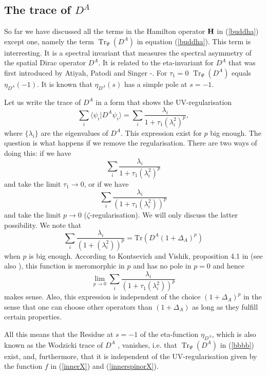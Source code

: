 \documentclass[12pt]{article}
\newcommand{\Tr}{\operatorname{Tr}}
\begin{document}
\subsection{The trace of $D^A$ }

So far we have discussed all the terms in the Hamilton operator ${\bf H}$ in (\ref{buddha}) except one, namely the term $\Tr_\Psi (D^A)$ in equation (\ref{buddha}).
This term  is interresting. It is a spectral invariant that measures the spectral asymmetry of the spatial Dirac operator $D^A$. It is related to the eta-invariant for $D^A$ that was first introduced by Atiyah, Patodi and Singer \cite{Atiyah}-\cite{AtiyahIII}. For $\tau_1=0$ $\Tr_\Psi (D^A)$ equals $\eta_{D^A}(-1)$. It is known \cite{AtiyahIII} that $\eta_{D^A}(s)$ has a simple pole at $s=-1$. 

Let us write the trace of $D^A$ in a form that shows the UV-regularisation
\begin{equation}
    \sum_i \langle \psi_i \vert D^A \psi_i \rangle = \sum_i \frac{\lambda_i}{1+\tau_1 (\lambda_i^2)^p},
\end{equation}
where $\{\lambda_i\}$ are the eigenvalues of $D^A$. This expression exist for $p$ big enough. The question is what happens if we remove the regularisation. There are two ways of doing this: if we have
\begin{equation}
     \sum_i \frac{\lambda_i}{1+\tau_1 (\lambda_i^2)^p}
\end{equation}
and take the limit $\tau_1\rightarrow 0$, or if we have
\begin{equation}
     \sum_i \frac{\lambda_i}{(1+\tau_1 (\lambda_i^2))^p}
\end{equation}
and take the limit $p\rightarrow 0$ ($\zeta$-regularisation).
We will only discuss the latter possibility. We note that
\begin{equation}
     \sum_i \frac{\lambda_i}{(1+ (\lambda_i^2))^p}
     = \mbox{Tr} \left( D^A (1+ \Delta_A )^p\right)
\end{equation}
when $p$ is big enough. According to Kontsevich and Vishik, proposition 4.1 in \cite{Kontsevich1} (see also \cite{Kontsevich2}), this function is meromorphic in $p$ and has no pole in $p=0$ and hence 
$$
\lim_{p\rightarrow 0} \sum_i \frac{\lambda_i}{(1+\tau_1 (\lambda_i^2))^p}
$$
makes sense. Also, this expression is independent of the choice $(1+\Delta_A)^p$ in the sense that one can choose other operators than $(1+\Delta_A)$ as long as they fulfill certain properties. 

All this means that the Residue at $s=-1$ of the eta-function $\eta_{D^A}$, which is also known as the Wodzicki trace of $D^A$ \cite{wodzicki}, vanishes, i.e. that $\Tr_\Psi (D^A)$ in (\ref{bbbb}) exist, and, furthermore, that it is independent of the UV-regularisation given by the function $f$ in (\ref{innerX}) and (\ref{innerspinorX}).\\
\end{document}
